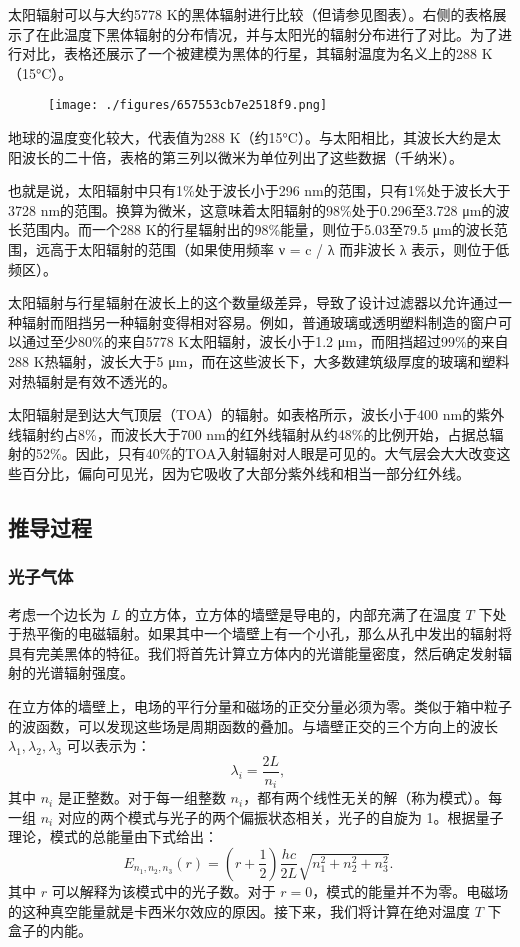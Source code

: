 太阳辐射可以与大约5778 K的黑体辐射进行比较（但请参见图表）。右侧的表格展示了在此温度下黑体辐射的分布情况，并与太阳光的辐射分布进行了对比。为了进行对比，表格还展示了一个被建模为黑体的行星，其辐射温度为名义上的288 K（15°C）。
\begin{figure}[ht]
\centering
\texttt{[image: ./figures/657553cb7e2518f9.png]}
\caption{} \label{fig_HTFS_9}
\end{figure}
地球的温度变化较大，代表值为288 K（约15°C）。与太阳相比，其波长大约是太阳波长的二十倍，表格的第三列以微米为单位列出了这些数据（千纳米）。

也就是说，太阳辐射中只有1\%处于波长小于296 nm的范围，只有1\%处于波长大于3728 nm的范围。换算为微米，这意味着太阳辐射的98\%处于0.296至3.728 μm的波长范围内。而一个288 K的行星辐射出的98\%能量，则位于5.03至79.5 μm的波长范围，远高于太阳辐射的范围（如果使用频率 ν = c / λ 而非波长 λ 表示，则位于低频区）。

太阳辐射与行星辐射在波长上的这个数量级差异，导致了设计过滤器以允许通过一种辐射而阻挡另一种辐射变得相对容易。例如，普通玻璃或透明塑料制造的窗户可以通过至少80\%的来自5778 K太阳辐射，波长小于1.2 μm，而阻挡超过99\%的来自288 K热辐射，波长大于5 μm，而在这些波长下，大多数建筑级厚度的玻璃和塑料对热辐射是有效不透光的。

太阳辐射是到达大气顶层（TOA）的辐射。如表格所示，波长小于400 nm的紫外线辐射约占8\%，而波长大于700 nm的红外线辐射从约48\%的比例开始，占据总辐射的52\%。因此，只有40\%的TOA入射辐射对人眼是可见的。大气层会大大改变这些百分比，偏向可见光，因为它吸收了大部分紫外线和相当一部分红外线。
\subsection{推导过程}
\subsubsection{光子气体}
考虑一个边长为 \( L \) 的立方体，立方体的墙壁是导电的，内部充满了在温度 \( T \) 下处于热平衡的电磁辐射。如果其中一个墙壁上有一个小孔，那么从孔中发出的辐射将具有完美黑体的特征。我们将首先计算立方体内的光谱能量密度，然后确定发射辐射的光谱辐射强度。

在立方体的墙壁上，电场的平行分量和磁场的正交分量必须为零。类似于箱中粒子的波函数，可以发现这些场是周期函数的叠加。与墙壁正交的三个方向上的波长 \( \lambda_1, \lambda_2, \lambda_3 \) 可以表示为：
\[
\lambda_i = \frac{2L}{n_i},~
\]
其中 \( n_i \) 是正整数。对于每一组整数 \( n_i \)，都有两个线性无关的解（称为模式）。每一组 \( n_i \) 对应的两个模式与光子的两个偏振状态相关，光子的自旋为 1。根据量子理论，模式的总能量由下式给出：
\[
E_{n_1, n_2, n_3}(r) = \left( r + \frac{1}{2} \right) \frac{hc}{2L} \sqrt{n_1^2 + n_2^2 + n_3^2}.~
\]
其中 \( r \) 可以解释为该模式中的光子数。对于 \( r = 0 \)，模式的能量并不为零。电磁场的这种真空能量就是卡西米尔效应的原因。接下来，我们将计算在绝对温度 \( T \) 下盒子的内能。

